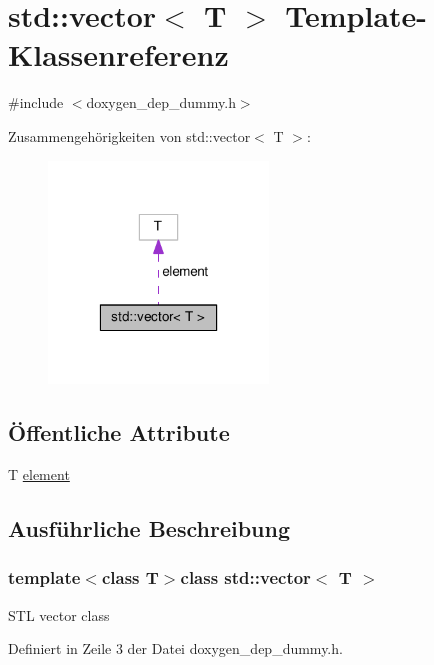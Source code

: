 \hypertarget{classstd_1_1vector}{\section{std\-:\-:vector$<$ T $>$ Template-\/\-Klassenreferenz}
\label{classstd_1_1vector}
}


{\ttfamily \#include $<$doxygen\-\_\-dep\-\_\-dummy.\-h$>$}



Zusammengehörigkeiten von std\-:\-:vector$<$ T $>$\-:
\nopagebreak
\begin{figure}[H]
\begin{center}
\leavevmode
\includegraphics[width=166pt]{classstd_1_1vector__coll__graph}
\end{center}
\end{figure}
\subsection*{Öffentliche Attribute}
\begin{DoxyCompactItemize}
\item 
T \hyperlink{classstd_1_1vector_aa4413180f775cf542ab040103fb94438}{element}
\end{DoxyCompactItemize}


\subsection{Ausführliche Beschreibung}
\subsubsection*{template$<$class T$>$class std\-::vector$<$ T $>$}

S\-T\-L vector class 

Definiert in Zeile 3 der Datei doxygen\-\_\-dep\-\_\-dummy.\-h.



